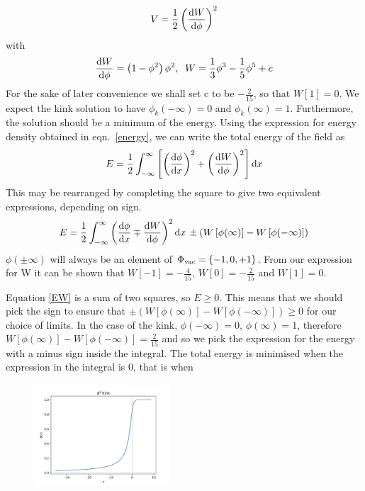 \documentclass[11pt, oneside]{article}  	%
\numberwithin{equation}{section}
\newcommand{\drv}{\ensuremath{\textup{d}}}
\begin{document}
 \begin{equation}
 V = \frac{1}{2} \left ( \frac{\textup{d}W}{\textup{d}\phi}\right )^2
 \end{equation}
 with
 \begin{equation}\label{dw}
 \frac{\textup{d}W}{\textup{d}\phi} = \left ( 1 - \phi^2 \right ) \phi^2 ,\; \;W = \frac{1}{3}\phi^3 - \frac{1}{5}\phi^5 +c
 \end{equation}
For the sake of later convenience we shall set c to be $-\frac{2}{15}$, so that $W[1]=0$. We expect the kink solution to have $\phi_k (-\infty )= 0$ and $\phi_k (\infty )= 1$. Furthermore, the solution should be a minimum of the energy. Using the expression for energy density obtained in eqn.~\ref{energy}, we can write the total energy of the field as
 \begin{equation}\label{EW}
E = \frac{1}{2} \int_{-\infty}^{\infty} \left [ \left(\frac{\textup{d}\phi}{\textup{d}x}\right)^2 + \left(\frac{\textup{d}W}{\textup{d}\phi}\right)^2 \right ]\drv x 
 \end{equation}
 This may be rearranged by completing the square to give two equivalent expressions, depending on sign.
 \begin{equation}\label{energy_bogo}
E = \frac{1}{2} \int_{-\infty}^{\infty}\left (  \frac{\textup{d}\phi}{\textup{d}x} \mp \frac{\textup{d}W}{\textup{d}\phi} \right )^2 \drv x  \, \pm \left( W\left [  \phi(\infty)\right ]  -  W\left [  \phi(-\infty)\right ]\right)
 \end{equation}
$\phi(\pm\infty)$ will always be an element of $\Phi_{\textup{vac}} = \left \{ -1,0,+1\right \}$. From our expression for W it can be shown that $W[-1] = -\frac{4}{15}$, $W[0] = -\frac{2}{15}$ and $W[1] = 0$.\par
 Equation \ref{EW} is a sum of two squares, so $E\geqslant 0$. This means that we should pick the sign to ensure that $ \pm \left( W\left [  \phi(\infty)\right ]  -  W\left [  \phi(-\infty)\right ]\right) \geqslant 0$ for our choice of limits. In the case of the kink, $\phi(-\infty) = 0,\, \phi(\infty) = 1 $, therefore $W\left [  \phi(\infty)\right ]  -  W\left [  \phi(-\infty)\right ] = \frac{2}{15}$ and so we pick the expression for the energy with a minus sign inside the integral. The total energy is minimised when the expression in the integral is 0, that is when
  \begin{figure}
\centering
 \includegraphics[width=0.45\textwidth]{phi8_kink.png}
  \label{phi8kink}
\end{figure}
\end{document}
